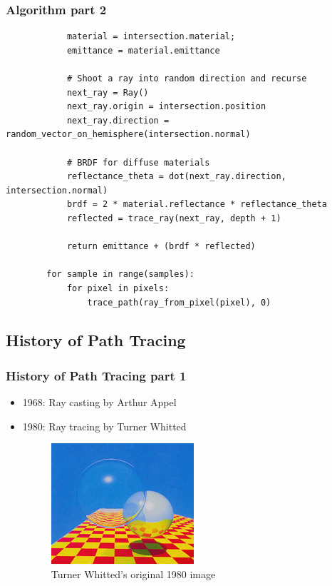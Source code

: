 \documentclass{beamer}
\begin{document}
\begin{frame}[fragile]
    \frametitle{Algorithm part 2}
    \scriptsize
    \begin{verbatim}
            material = intersection.material;
            emittance = material.emittance

            # Shoot a ray into random direction and recurse
            next_ray = Ray()
            next_ray.origin = intersection.position
            next_ray.direction = random_vector_on_hemisphere(intersection.normal)

            # BRDF for diffuse materials
            reflectance_theta = dot(next_ray.direction, intersection.normal)
            brdf = 2 * material.reflectance * reflectance_theta
            reflected = trace_ray(next_ray, depth + 1)

            return emittance + (brdf * reflected)

        for sample in range(samples):
            for pixel in pixels:
                trace_path(ray_from_pixel(pixel), 0)
    \end{verbatim}
\end{frame}

\subsection{History of Path Tracing}
\begin{frame}
    \frametitle{History of Path Tracing part 1}
    \begin{itemize}
        \item 1968: Ray casting by Arthur Appel
        \item 1980: Ray tracing by Turner Whitted
        \begin{figure}[H]
            \includegraphics[scale=0.8]{early-raytracing-whitted}
            \centering
            \caption{Turner Whitted's original 1980 image}
        \end{figure}
    \end{itemize}
\end{frame}
\end{document}

